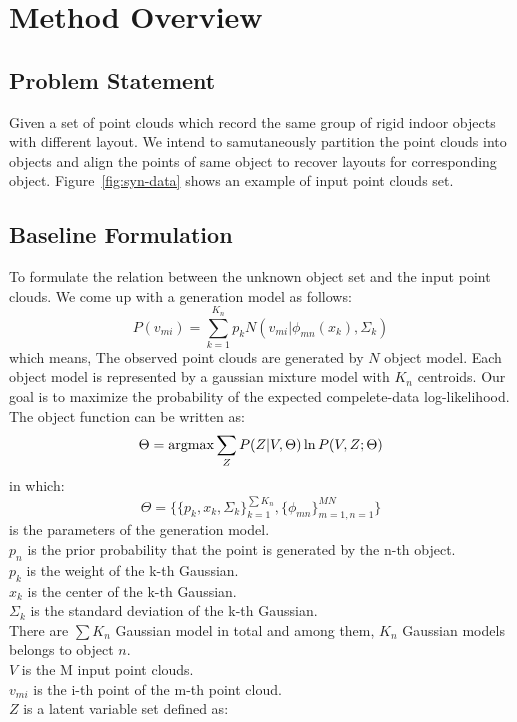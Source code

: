 \section{Method Overview}
\label{sec:method}
\subsection{Problem Statement}
Given a set of point clouds which record the same group of rigid indoor objects with different layout. We intend to samutaneously partition the point clouds into objects and align the points of same object to recover layouts for corresponding object. Figure~\ref{fig:syn-data} shows an example of input point clouds set.
\subsection{Baseline Formulation}
To formulate the relation between the unknown object set and the input point clouds. We come up with a generation model as follows:
\begin{equation}
\label{equ:model}
P(v_{mi})=\sum^{K_n}_{k=1}p_kN(v_{mi}|\phi_{mn}(x_k),\Sigma_k)
\end{equation}
which means,
The observed point clouds are generated by $N$ object model. 
Each object model is represented by a gaussian mixture model with $K_n$ centroids.
Our goal is to maximize the probability of the expected compelete-data log-likelihood. 
The object function can be written as:
\begin{equation}
\label{equ:obj0}
\Theta=\operatorname*{argmax}{\sum_ZP(Z|V,\Theta)\ln{P(V,Z;\Theta)}}
\end{equation}
in which:
$$\Theta=\{\{p_k,x_k,\Sigma_k\}_{k=1}^{\sum{K_n}},\{\phi_{mn}\}_{m=1,n=1}^{MN}\}$$
is the parameters of the generation model.\\
$p_n$ is the prior probability that the point is generated by the n-th object.\\
$p_k$ is the weight of the k-th Gaussian.\\
$x_k$ is the center of the k-th Gaussian.\\
$\Sigma_k$ is the standard deviation of the k-th Gaussian.\\
There are $\sum{K_n}$ Gaussian model in total and among them, $K_n$ Gaussian models belongs to object $n$.\\
$V$ is the M input point clouds.\\
$v_{mi}$ is the i-th point of the m-th point cloud.\\
$Z$ is a latent variable set defined as:\\
